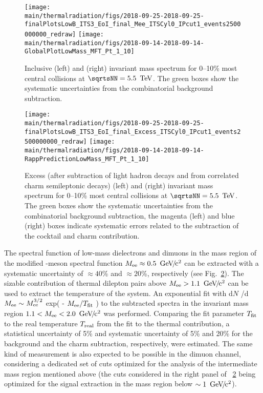 \documentclass[../report.tex]{subfiles}
\providecommand{\main}{..}
\begin{document}
\begin{figure}[htb]
\centering
\texttt{[image: \\main/thermalradiation/figs/2018-09-25-2018-09-25-finalPlotsLowB\_ITS3\_EoI\_final\_Mee\_ITSCyl0\_IPcut1\_events2500000000\_redraw]}
\texttt{[image: \\main/thermalradiation/figs/2018-09-14-2018-09-14-GlobalPlotLowMass\_MFT\_Pt\_1\_10]}
\caption{Inclusive \Pepem (left) and \PGmpGmm (right) invariant mass spectrum for 0--10\% most central \PbPb{} collisions at $\sqrtsNN = \unit[5.5]{\UTeV}$. The green boxes show the systematic uncertainties from the combinatorial background subtraction.}
\label{fig:DileptonsSpectra}
\end{figure}

\begin{figure}[htb]
\centering
\texttt{[image: \\main/thermalradiation/figs/2018-09-25-2018-09-25-finalPlotsLowB\_ITS3\_EoI\_final\_Excess\_ITSCyl0\_IPcut1\_events2500000000\_redraw]}
\texttt{[image: \\main/thermalradiation/figs/2018-09-14-2018-09-14-RappPredictionLowMass\_MFT\_Pt\_1\_10]}
\caption{Excess (after subtraction of light hadron decays and from correlated charm semileptonic decays) \Pepem (left) and \PGmpGmm (right) invariant mass spectrum for 0--10\% most central \PbPb{} collisions at $\sqrtsNN = \unit[5.5]{\UTeV}$. The green boxes show the systematic uncertainties from the combinatorial background subtraction, the magenta (left) and blue (right) boxes indicate systematic errors related to the subtraction of the cocktail and charm contribution.}
\label{fig:DileptonsSpectraSubtracted}
\end{figure}

The spectral function of low-mass dielectrons and dimuons in the mass region of the modified \PGr-meson spectral function $M_{\rm ee}\approx\unit[0.5]{\UGeVcc}$ can be extracted with a systematic uncertainty of $\approx 40$\% and $\approx 20$\%, respectively (see Fig.~\ref{fig:DileptonsSpectraSubtracted}). 
The sizable contribution of thermal dilepton pairs above $M_{\rm ee}>\unit[1.1]{\UGeVcc}$ can be used to extract the temperature of the system. An exponential fit with d$N$ /d$M_{\rm ee} \sim  M_{\rm ee}^{3/2}$ exp( - $M_{\rm ee} /T_{\rm fit}$ ) to the subtracted \Pepem spectra in the invariant mass region $1.1 < M_{\rm ee} < \unit[2.0]{\UGeVcc}$ was performed. Comparing the fit parameter $T_{\rm fit}$ to the real temperature $T_{\rm real}$ from the fit to the thermal contribution, a statistical uncertainty of 5\% and systematic uncertainty of 5\% and 20\% for the background and the charm subtraction, respectively, were estimated. The same kind of measurement is also expected to be possible in the dimuon channel, considering a dedicated set of cuts optimized for the analysis of the intermediate mass region mentioned above (the cuts considered in the right panel of \figurename~\ref{fig:DileptonsSpectraSubtracted} being optimized for the signal extraction in the mass region below $\sim \unit[1]{\UGeVcc}$).
\end{document}
